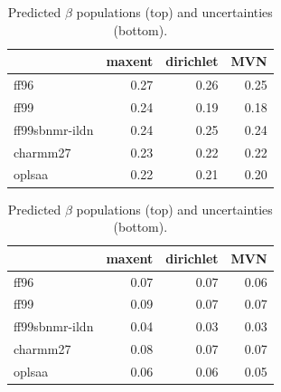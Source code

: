 \documentclass[12pt]{article}
\begin{document}
\begin{table}

\begin{tabular}{lrrr}
\toprule
{} &  maxent &  dirichlet &  MVN \\
\midrule
ff96           &    0.27 &       0.26 & 0.25 \\
ff99           &    0.24 &       0.19 & 0.18 \\
ff99sbnmr-ildn &    0.24 &       0.25 & 0.24 \\
charmm27          &    0.23 &       0.22 & 0.22 \\
oplsaa            &    0.22 &       0.21 & 0.20 \\
\bottomrule
\end{tabular}


\begin{tabular}{lrrr}
\toprule
{} &  maxent &  dirichlet &  MVN \\
\midrule
ff96           &    0.07 &       0.07 & 0.06 \\
ff99           &    0.09 &       0.07 & 0.07 \\
ff99sbnmr-ildn &    0.04 &       0.03 & 0.03 \\
charmm27          &    0.08 &       0.07 & 0.07 \\
oplsaa            &    0.06 &       0.06 & 0.05 \\
\bottomrule
\end{tabular}

\caption{
Predicted $\beta$ populations (top) and uncertainties (bottom).  
}
\end{table}

\clearpage
\end{document}

